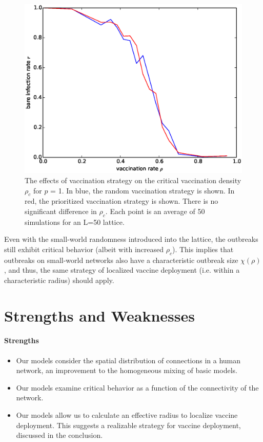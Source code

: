 \documentclass{article}
\begin{document}
\begin{figure}[h!]
\centering
\includegraphics[scale=0.5]{figs/prior_vs_rand_p=1.eps}
\caption{The effects of vaccination strategy on the critical vaccination density $\rho_c$ for $p$ = 1. In blue, the random vaccination strategy is shown. In red, the prioritized vaccination strategy is shown. There is no significant difference in $\rho_c$. Each point is an average of 50 simulations for an L=50 lattice.} 
\label{fig:rand_v_prior}
\end{figure}

Even with the small-world randomness introduced into the lattice, the outbreaks still exhibit critical behavior (albeit with increased $\rho_c$). This implies that outbreaks on small-world networks also have a characteristic outbreak size $\chi(\rho)$, and thus, the same strategy of localized vaccine deployment (i.e. within a characteristic radius) should apply.

\section{Strengths and Weaknesses}
\paragraph{Strengths}
\begin{itemize}
\item Our models consider the spatial distribution of connections in a human network, an improvement to the homogeneous mixing of basic models.
\item Our models examine critical behavior as a function of the connectivity of the network.
\item Our models allow us to calculate an effective radius to localize vaccine deployment. This suggests a realizable strategy for vaccine deployment, discussed in the conclusion.
\end{itemize}
\end{document}
